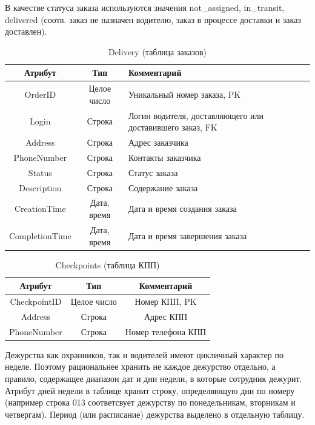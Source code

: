 В качестве статуса заказа используются значения not\_assigned, in\_transit, delivered (соотв. заказ не назначен водителю, заказ в процессе доставки и заказ доставлен).
\begin{table}[h!] \label{del_table}
	\begin{center}
		\caption{Delivery (таблица заказов)}
		\begin{tabular}{| c | c | p{10cm} |}
			\hline
			\textbf{Атрибут}		&	\textbf{Тип}		& \textbf{Комментарий} \\
			\hline
			OrderID		&	Целое число	&	Уникальный номер заказа, PK \\ \hline
			Login 		&	Строка		&	Логин водителя, доставляющего или доставившего заказ, FK \\ \hline
			Address 	&	Строка 		&	Адрес заказчика \\ \hline
			PhoneNumber	&	Строка 		&	Контакты заказчика \\ \hline
			Status 		& 	Строка		&	Статус заказа \\ \hline
			Description	& 	Строка		&	Содержание заказа \\ \hline
			CreationTime	& Дата, время	&	Дата и время создания заказа \\ \hline
			CompletionTime	& Дата, время	&	Дата и время завершения заказа \\ \hline
		\end{tabular}
	\end{center}
\end{table}

\begin{table}[h!] \label{checkp_table}
	\begin{center}
		\caption{Checkpoints (таблица КПП)}
		\begin{tabular}{| c | c | c |}
			\hline
			\textbf{Атрибут}		&	\textbf{Тип}		& \textbf{Комментарий} \\
			\hline
			CheckpointID	&	Целое число	&	Номер КПП, PK \\ \hline
			Address			&	Строка		&	Адрес КПП \\ \hline
			PhoneNumber		&	Строка		&	Номер телефона КПП \\ \hline
		\end{tabular}
	\end{center}
\end{table}


Дежурства как охранников, так и водителей имеют цикличный характер по неделе. Поэтому рациональнее хранить не каждое дежурство отдельно, а правило, содержащее диапазон дат и дни недели, в которые сотрудник дежурит. Атрибут дней недели в таблице хранит строку, определяющую дни по номеру (например строка 013 соответсвует дежурству по понедельникам, вторникам и четвергам). Период (или расписание) дежурства выделено в отдельную таблицу.

